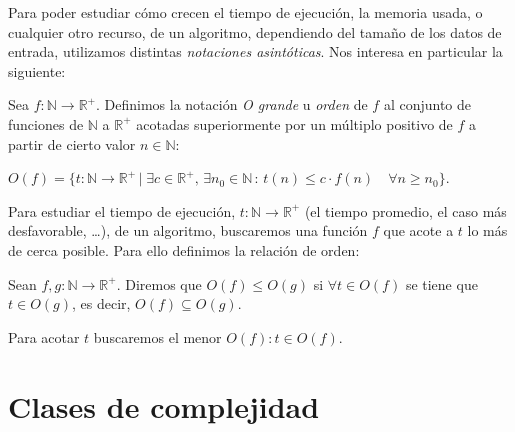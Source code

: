 Para poder estudiar cómo crecen el tiempo de ejecución, la memoria usada, o cualquier otro recurso, de un algoritmo, dependiendo del tamaño de los datos de entrada, utilizamos distintas \textit{notaciones asintóticas}. Nos interesa en particular la siguiente:

\begin{definition}
	Sea $f : \mathbb{N} \rightarrow \mathbb{R}^+$. Definimos la notación \textit{O grande} u \textit{orden} de $f$ al conjunto de funciones de $\mathbb{N}$ a $\mathbb{R}^+$ acotadas superiormente por un múltiplo positivo de $f$ a partir de cierto valor $n \in \mathbb{N}$:
	
	$O(f) = \{t:\mathbb{N} \rightarrow \mathbb{R}^+ \, | \; \exists c \in \mathbb{R}^+,\, \exists 
	n_0\in \mathbb{N} \, : \, t(n) \leq c\cdot f(n) \quad \forall n \geq n_0  \}$. 
	
\end{definition}

\hfil

Para estudiar el tiempo de ejecución, $t : \mathbb{N} \rightarrow \mathbb{R}^+$ (el tiempo promedio, el caso más desfavorable, \dots), de un algoritmo, buscaremos una función $f$ que acote a $t$ lo más de cerca posible. Para ello definimos la relación de orden:

\begin{definition}
	Sean $f, g : \mathbb{N} \rightarrow \mathbb{R}^+$.
	Diremos que  $O(f) \leq O(g)$ si $\forall t \in O(f)$ se tiene que $t \in O(g)$, es decir,  $O(f) \subseteq O(g)$.
\end{definition}

Para acotar $t$ buscaremos el menor $O(f) : t\in O(f)$.


\hfil 

\section{Clases de complejidad}

